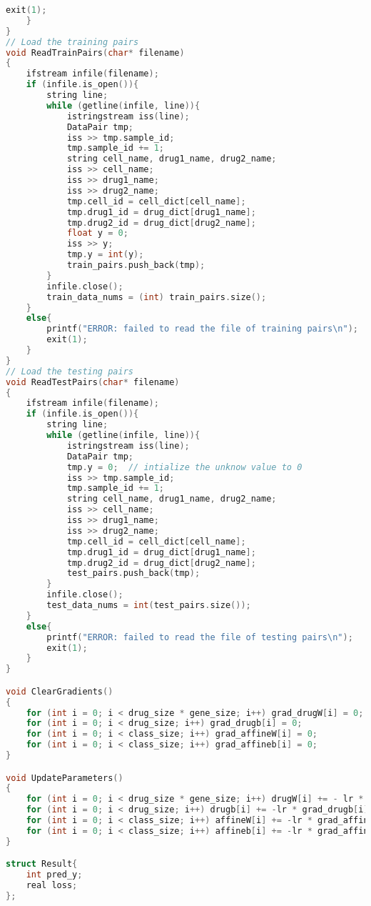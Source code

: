 \documentclass{article}
\begin{document}
\begin{lstlisting}[language=c++]
        exit(1);
    }
}
// Load the training pairs
void ReadTrainPairs(char* filename)
{
    ifstream infile(filename);
    if (infile.is_open()){
        string line;
        while (getline(infile, line)){
            istringstream iss(line);
            DataPair tmp;
            iss >> tmp.sample_id;
            tmp.sample_id += 1;
            string cell_name, drug1_name, drug2_name;
            iss >> cell_name;
            iss >> drug1_name;
            iss >> drug2_name;
            tmp.cell_id = cell_dict[cell_name];
            tmp.drug1_id = drug_dict[drug1_name];
            tmp.drug2_id = drug_dict[drug2_name];
            float y = 0;
            iss >> y;
            tmp.y = int(y);
            train_pairs.push_back(tmp);
        }
        infile.close();
        train_data_nums = (int) train_pairs.size();
    }
    else{
        printf("ERROR: failed to read the file of training pairs\n");
        exit(1);
    }
}
// Load the testing pairs
void ReadTestPairs(char* filename)
{
    ifstream infile(filename);
    if (infile.is_open()){
        string line;
        while (getline(infile, line)){
            istringstream iss(line);
            DataPair tmp;
            tmp.y = 0;  // intialize the unknow value to 0
            iss >> tmp.sample_id;
            tmp.sample_id += 1;
            string cell_name, drug1_name, drug2_name;
            iss >> cell_name;
            iss >> drug1_name;
            iss >> drug2_name;
            tmp.cell_id = cell_dict[cell_name];
            tmp.drug1_id = drug_dict[drug1_name];
            tmp.drug2_id = drug_dict[drug2_name];
            test_pairs.push_back(tmp);
        }
        infile.close();
        test_data_nums = int(test_pairs.size());
    }
    else{
        printf("ERROR: failed to read the file of testing pairs\n");
        exit(1);
    }
}

void ClearGradients()
{
    for (int i = 0; i < drug_size * gene_size; i++) grad_drugW[i] = 0;
    for (int i = 0; i < drug_size; i++) grad_drugb[i] = 0;
    for (int i = 0; i < class_size; i++) grad_affineW[i] = 0;
    for (int i = 0; i < class_size; i++) grad_affineb[i] = 0;
}

void UpdateParameters()
{
    for (int i = 0; i < drug_size * gene_size; i++) drugW[i] += - lr * grad_drugW[i];
    for (int i = 0; i < drug_size; i++) drugb[i] += -lr * grad_drugb[i];
    for (int i = 0; i < class_size; i++) affineW[i] += -lr * grad_affineW[i];
    for (int i = 0; i < class_size; i++) affineb[i] += -lr * grad_affineb[i];
}

struct Result{
    int pred_y;
    real loss;
};


\end{lstlisting}
\end{document}
